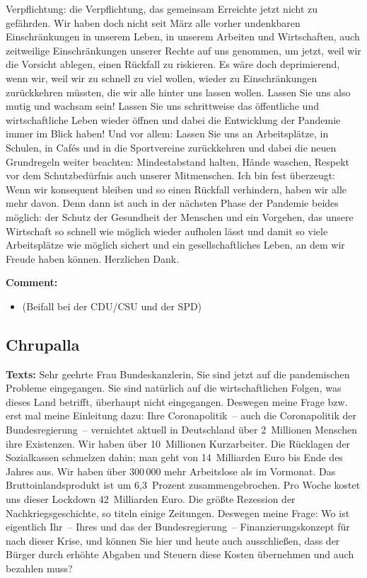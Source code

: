 \documentclass{article}
\begin{document}
Verpflichtung: die Verpflichtung, das gemeinsam Erreichte jetzt nicht zu gefährden. Wir haben doch nicht seit März alle vorher undenkbaren Einschränkungen in unserem Leben, in unserem Arbeiten und Wirtschaften, auch zeitweilige Einschränkungen unserer Rechte auf uns genommen, um jetzt, weil wir die Vorsicht ablegen, einen Rückfall zu riskieren. Es wäre doch deprimierend, wenn wir, weil wir zu schnell zu viel wollen, wieder zu Einschränkungen zurückkehren müssten, die wir alle hinter uns lassen wollen. Lassen Sie uns also mutig und wachsam sein! Lassen Sie uns schrittweise das öffentliche und wirtschaftliche Leben wieder öffnen und dabei die Entwicklung der Pandemie immer im Blick haben! Und vor allem: Lassen Sie uns an Arbeitsplätze, in Schulen, in Cafés und in die Sportvereine zurückkehren und dabei die neuen Grundregeln weiter beachten: Mindestabstand halten, Hände waschen, Respekt vor dem Schutzbedürfnis auch unserer Mitmenschen. Ich bin fest überzeugt: Wenn wir konsequent bleiben und so einen Rückfall verhindern, haben wir alle mehr davon. Denn dann ist auch in der nächsten Phase der Pandemie beides möglich: der Schutz der Gesundheit der Menschen und ein Vorgehen, das unsere Wirtschaft so schnell wie möglich wieder aufholen lässt und damit so viele Arbeitsplätze wie möglich sichert und ein gesellschaftliches Leben, an dem wir Freude haben können. Herzlichen Dank. 

\noindent\textbf{Comment:}
\begin{itemize}
    \setlength\itemsep{-3pt}
    \item (Beifall bei der CDU/CSU und der SPD)
\end{itemize}
\subsection{Chrupalla}
\noindent\textbf{Texts:} Sehr geehrte Frau Bundeskanzlerin, Sie sind jetzt auf die pandemischen Probleme eingegangen. Sie sind natürlich auf die wirtschaftlichen Folgen, was dieses Land betrifft, überhaupt nicht eingegangen. Deswegen meine Frage bzw. erst mal meine Einleitung dazu: Ihre Coronapolitik – auch die Coronapolitik der Bundesregierung – vernichtet aktuell in Deutschland über 2 Millionen Menschen ihre Existenzen. Wir haben über 10 Millionen Kurzarbeiter. Die Rücklagen der Sozialkassen schmelzen dahin; man geht von 14 Milliarden Euro bis Ende des Jahres aus. Wir haben über 300 000 mehr Arbeitslose als im Vormonat. Das Bruttoinlandsprodukt ist um 6,3 Prozent zusammengebrochen. Pro Woche kostet uns dieser Lockdown 42 Milliarden Euro. Die größte Rezession der Nachkriegsgeschichte, so titeln einige Zeitungen. Deswegen meine Frage: Wo ist eigentlich Ihr – Ihres und das der Bundesregierung – Finanzierungskonzept für nach dieser Krise, und können Sie hier und heute auch ausschließen, dass der Bürger durch erhöhte Abgaben und Steuern diese Kosten übernehmen und auch bezahlen muss?
\end{document}
